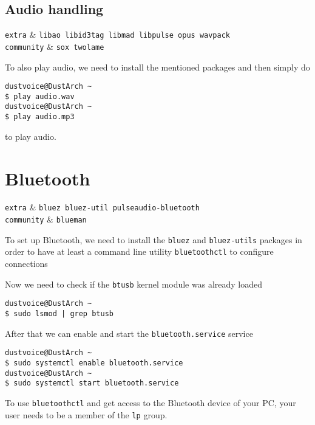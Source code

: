 \documentclass[10pt]{dustdoc}
\begin{document}
\subsection{Audio handling}
\label{sec:audio-handling}

\begin{packagetable}
    \texttt{extra} & \texttt{libao libid3tag libmad libpulse opus wavpack} \\
    \texttt{community} & \texttt{sox twolame} \\
\end{packagetable}

To also play audio, we need to install the mentioned packages and then simply do

\begin{verbatim}
dustvoice@DustArch ~
$ play audio.wav
dustvoice@DustArch ~
$ play audio.mp3
\end{verbatim}

\noindent
to play audio.

\section{Bluetooth}
\label{sec:bluetooth}

\begin{packagetable}
    \texttt{extra} & \texttt{bluez bluez-util pulseaudio-bluetooth} \\
    \texttt{community} & \texttt{blueman} \\
\end{packagetable}

To set up Bluetooth, we need to install the \texttt{bluez} and \texttt{bluez-utils} packages in order to have at least a command line utility \texttt{bluetoothctl} to configure connections

Now we need to check if the \texttt{btusb} kernel module was already loaded

\begin{verbatim}
dustvoice@DustArch ~
$ sudo lsmod | grep btusb
\end{verbatim}

After that we can enable and start the \texttt{bluetooth.service} service

\begin{verbatim}
dustvoice@DustArch ~
$ sudo systemctl enable bluetooth.service
dustvoice@DustArch ~
$ sudo systemctl start bluetooth.service
\end{verbatim}

\begin{NOTE}
    To use \texttt{bluetoothctl} and get access to the Bluetooth device of your PC, your user needs to be a member of the \texttt{lp} group.
\end{NOTE}
\end{document}
